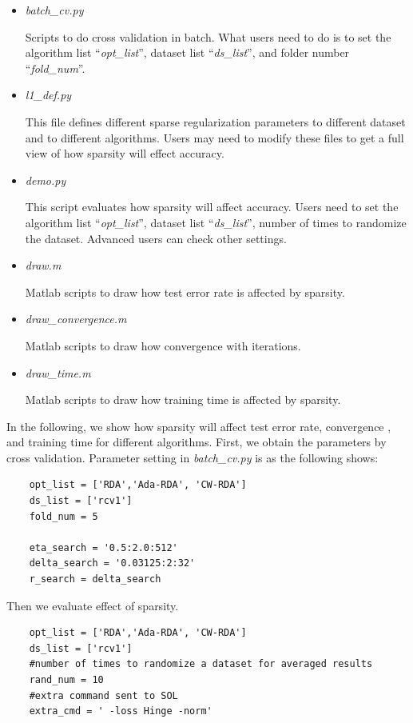 \documentclass[11pt,a4paper]{article}
\newlength{\wideitemsep}
\let\olditem\item
\renewcommand{\item}{\setlength{\itemsep}{\wideitemsep}\olditem}
\begin{document}
\begin{itemize}
\begin{itemize}
        \end{itemize}

    \item \emph{batch\_cv.py}

        Scripts to do cross validation in batch. What users need to do is to set the
        algorithm list ``\emph{opt\_list}'', dataset list
        ``\emph{ds\_list}'', and folder number ``\emph{fold\_num}''.

    \item \emph{l1\_def.py} 

        This file defines different sparse regularization parameters to different
        dataset and to different algorithms. Users may need to modify these
        files to get a full view of how sparsity will effect accuracy.

    \item \emph{demo.py}

        This script evaluates how sparsity will affect accuracy. Users need to
        set the algorithm list ``\emph{opt\_list}'', dataset list
        ``\emph{ds\_list}'', number of times to randomize the dataset. Advanced
        users can check other settings.

    \item \emph{draw.m}

        Matlab scripts to draw how test error rate is affected by sparsity.
    \item \emph{draw\_convergence.m}

        Matlab scripts to draw how convergence with iterations.
    \item \emph{draw\_time.m}

        Matlab scripts to draw how training time is affected by sparsity.
\end{itemize}

In the following, we show how sparsity will affect test error rate, convergence
, and training time for different algorithms. First, we obtain the parameters by
cross validation. Parameter setting in \emph{batch\_cv.py} is as the following
shows:
\lstset{language=python,
    framexleftmargin=-.5cm,
    xleftmargin=-0.5cm,
}
\begin{lstlisting}
    opt_list = ['RDA','Ada-RDA', 'CW-RDA']
    ds_list = ['rcv1']
    fold_num = 5
    
    eta_search = '0.5:2.0:512'
    delta_search = '0.03125:2:32'
    r_search = delta_search
\end{lstlisting}
Then we evaluate effect of sparsity.
\lstset{language=python}
\begin{lstlisting}
    opt_list = ['RDA','Ada-RDA', 'CW-RDA']
    ds_list = ['rcv1']
    #number of times to randomize a dataset for averaged results
    rand_num = 10
    #extra command sent to SOL
    extra_cmd = ' -loss Hinge -norm'
\end{lstlisting}
\end{document}
